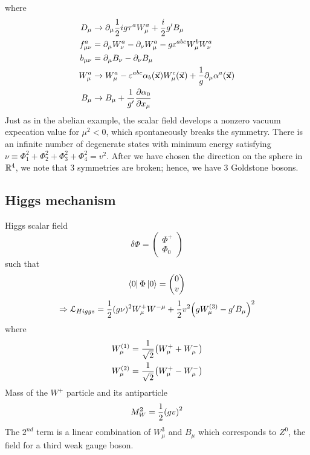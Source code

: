 \documentclass[../main/main.tex]{subfiles}
\begin{document}
where
\begin{subequations}
\begin{align*}
     D_ \mu  &\rightarrow \partial_ \mu \frac{1}{2} i g \tau ^a W_ \mu ^a + \frac{i}{2} g' B _ \mu \\
  f_ {\mu \nu }^a &= \partial_ \mu W_ \nu ^a - \partial_ \nu W _ \mu ^a - g \varepsilon ^{abc} W _ \mu ^b  W_ \nu ^a \\
  b_ {\mu \nu } &= \partial_ \mu B _ \nu - \partial_ \nu  B _ \mu \\
  W_ \mu ^a & \rightarrow W_ \mu ^a - \varepsilon ^{abc} \alpha _b (\va{x}) W_ \mu ^c (\va{x}) + \frac{1}{g} \partial_ \mu \alpha ^a (\va{x})    \\
  B _ \mu  & \rightarrow  B _ \mu + \frac{1}{g'} \pdv{\alpha _0}{x_ \mu }
\end{align*}
\end{subequations}
Just as in the abelian example, the scalar field develops a nonzero vacuum expecation value for \( \mu ^2 <0 \), which spontaneously breaks the symmetry. There is an infinite number of degenerate states with minimum energy satisfying  \( \nu \equiv  \Phi _1^2 + \Phi _2^2 + \Phi _3^2 +\Phi _4^2 = v^2 \). After we have chosen the direction on the sphere in  \( \mathbb{R}^4 \), we note that 3 symmetries are broken; hence, we have 3 Goldstone bosons.

\subsection{Higgs mechanism}
Higgs scalar field
\begin{equation}
  \delta \Phi = \begin{pmatrix}
  \Phi ^+ \\
  \Phi _0
  \end{pmatrix}
\end{equation}
such that
\begin{equation}
  \bra{0} \Phi \ket{0} = \begin{pmatrix}
  0 \\
  v
  \end{pmatrix}
\end{equation}
\begin{equation}
  \Rightarrow \mathcal{L}_{Higgs} = \frac{1}{2} (g \nu )^2 W_ \mu ^+ W^{- \mu }
  + \frac{1}{2} v^2 \qty(g W _ \mu ^{(3)} - g' B _ \mu )^2
\end{equation}
where
\begin{subequations}
\begin{align}
  W_ \mu ^{(1)} &=  \frac{1}{\sqrt{2} } \qty(W_ \mu ^+ + W _ \mu ^-) \\
  W_ \mu ^{(2)} &=  \frac{1}{\sqrt{2} } \qty(W_ \mu ^+ - W _ \mu ^-)
\end{align}
\end{subequations}
Mass of the \( W^+ \) particle and its antiparticle
\begin{equation}
  M_W^2 = \frac{1}{2} \qty(g v)^2
\end{equation}
The \( 2^{nd} \) term is a linear combination of \( W_ \mu ^3 \) and \( B_ \mu  \) which corresponds to \( Z^0 \), the field for a third weak gauge boson.
\end{document}
